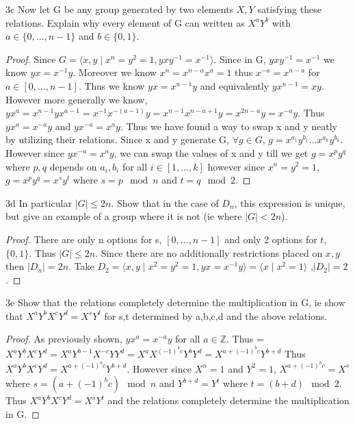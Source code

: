 \documentclass{article}
\newcommand{\Z}{\mathbb{Z}}
\newcommand{\abs}[1]{\lvert #1\rvert}
\newcommand{\angles}[1]{\langle{#1}\rangle}
\begin{document}
\begin{claim}{3c}
    Now let G be any group generated by two elements $X,Y$ satisfying these relations. Explain why every element of G can written as $X^a Y^b$ with $a \in \{0, \ldots ,n-1\}$ and $b \in \{0, 1\}$.
\end{claim}
\begin{proof}
    Since $G = \angles{x, y \mid x^n = y^2 = 1, yxy^{-1} = x^{-1}}$. Since in G, $yxy^{-1} = x^{-1}$ we know $yx = x^{-1}y$. Moreover we know $x^n = x^{n-a}x^a = 1$ thus $x^{-a} = x^{n-a}$ for $a \in [0, \ldots, n - 1]$. Thus we know $yx = x^{n - 1}y$ and equivalently $yx^{n-1} = xy$. However more generally we know, $yx^a = x^{n-1}yx^{a-1} = x^{-1}x^{-(a-1)}y = x^{n - 1}x^{n - a + 1}y = x^{2n - a}y = x^{-a}y$. Thus $yx^a = x^{-a}y$ and $yx^{-a} = x^{a}y$. Thus we have found a way to swap x and y neatly by utilizing their relations. Since x and y generate G, $\forall g \in G$, $g = x^{a_1}y^{b_1}\ldots x^{a_k}y^{b_k}$. However since $yx^{-a} = x^{a}y$, we can swap the values of x and y till we get $g = x^p y^q$ where $p, q$ depends on $a_i, b_i$ for all $i \in [1, \ldots, k]$ however since $x^n = y^2 = 1$,$g = x^p y^q = x^s y^t$ where $s = p \mod n$ and $t = q \mod 2$.
\end{proof}

\begin{claim}{3d}
    In particular $|G| \leq 2n$. Show that in the case of $D_n$, this expression is unique, but give an example of a group where it is not (ie where $|G| < 2n$).
\end{claim}
\begin{proof}
    There are only n options for s, $[0, \ldots, n - 1]$ and only 2 options for $t$, $\{0, 1\}$. Thus $|G| \leq 2n$. Since there are no additionally restrictions placed on $x, y$ then $\abs{D_n} = 2n$. Take $D_2 = \angles{x, y \mid x^2 = y^2 = 1, yx = x^{-1}y} = \angles{x \mid x^2 = 1}$ ,$\abs{D_2} = 2$. 
\end{proof}

\begin{claim}{3e}
    Show that the relations completely determine the multiplication in G, ie show that $X^a Y^b  X^c Y^d = X^s Y^t$ for  s,t determined by a,b,c,d and the above relations.
\end{claim}
\begin{proof}
    As previously shown, $yx^a = x^{-a}y$ for all $a \in \Z$. Thus = $X^a Y^b X^c Y^d = X^a Y^{b-1}X^{-c}YY^d = X^aX^{(-1)^bc}Y^bY^d = X^{a + (-1)^bc}Y^{b+d}$ Thus $X^aY^bX^cY^d = X^{a + (-1)^bc}Y^{b+d}$. However since $X^n = 1$ and $Y^2 = 1$, $X^{a + (-1)^bc} = X^{s}$ where $s = (a + (-1)^b c) \mod n$ and $Y^{b + d} = Y^t$ where $t = (b + d)\mod 2$. Thus  $X^aY^bX^cY^d = X^sY^t$ and the relations completely determine the multiplication in G.
\end{proof}
\end{document}
